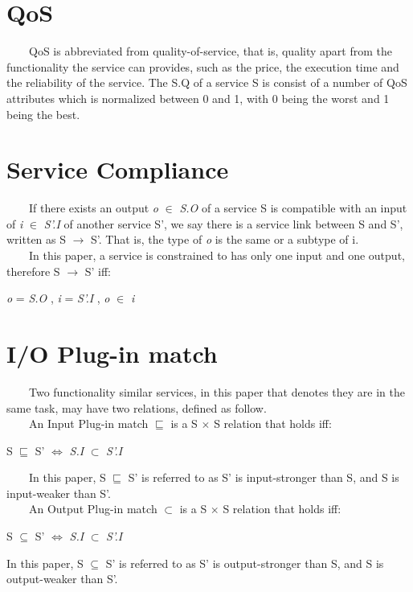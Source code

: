 \documentclass[senior,final,11pt]{iscs-thesis}
\begin{document}
\section{QoS}
~~~~QoS is abbreviated from quality-of-service, that is, quality apart from the functionality the service can provides, such as the price, the execution time and the reliability of the service.
The S.Q of a service S is consist of a number of QoS attributes which is normalized between 0 and 1, with 0 being the worst and 1 being the best.

\section{Service Compliance}
~~~~If there exists an output {\em o} $\in$ {\em S.O} of a service S is compatible with an input of {\em i}  $\in$ {\em S'.I} of another service S', we say there is a service link between S and S', written as S $\to$ S'. That is, the type of {\em o} is the same or a subtype of i. \\
~~~~In this paper, a service is constrained to has only one input and one output, therefore S $\to$ S' iff:
\begin{center}
{\em o} = {\em S.O} ,  {\em i} = {\em S'.I} ,  {\em o} $\in$ {\em i}
\end{center}

\section{I/O Plug-in match}
~~~~Two functionality similar services, in this paper that denotes they are in the same task, may have two relations, defined as follow\cite{paolucci2002semantic}.\\
~~~~An Input Plug-in match $\sqsubseteq$ is a S $\times$ S relation that holds iff:
\begin{center}
S $\sqsubseteq$ S'  $\Leftrightarrow$ {\em S.I} $\subset$ {\em S'.I}
\end{center}
~~~~In this paper, S $\sqsubseteq$ S' is referred to as S' is input-stronger than S, and S is input-weaker than S'.\\
~~~~An Output Plug-in match $\subset$ is a S $\times$ S relation that holds iff:
\begin{center}
S $\subseteq$ S' $\Leftrightarrow$ {\em S.I} $\subset$ {\em S'.I}
\end{center}

In this paper, S $\subseteq$ S' is referred to as S' is output-stronger than S, and S is output-weaker than S'.\\
\end{document}
